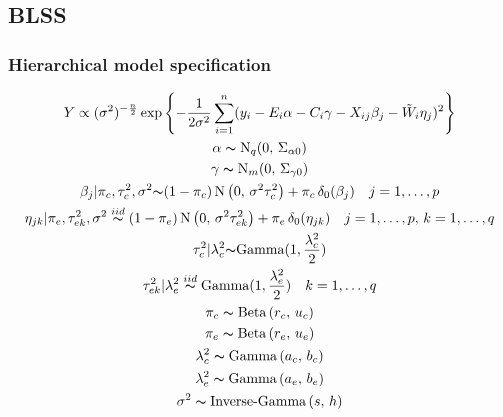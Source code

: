 \documentclass[12pt]{article}
\begin{document}
\subsection{BLSS}
\subsubsection{Hierarchical model specification}
\begin{gather*}
Y \propto (\sigma^{2})^{-\frac{n}{2}} \exp\left\{-\frac{1}{2\sigma^{2}} \sum_{i=1}^{n}(y_{i}- E_{i}\alpha - C_{i}\gamma - X_{ij}\beta_{j} - \tilde{W}_{i}\eta_{j})^{2} \right\} \\ 
\alpha \thicksim \text{N}_{q}(0, \, \Sigma_{\alpha0}) \\
\gamma \thicksim \text{N}_{m}(0, \, \Sigma_{\gamma0}) \\
\beta_{j}|\pi_{c}, \tau_{c}^{2}, \sigma^{2} {\thicksim} (1-\pi_{c})\, \text{N} \left(0,\, \sigma^{2} \tau_{c}^{2}\right) + \pi_c \,\delta_{0}(\beta_{j}) \quad j=1,\dots,p\\
\eta_{jk}|\pi_{e}, \tau_{ek}^{2}, \sigma^{2} \stackrel{iid}{\thicksim} (1-\pi_{e})\, \text{N} \left(0,\, \sigma^{2} \tau_{ek}^{2}\right) + \pi_e \,\delta_{0}(\eta_{jk}) \quad j=1,\dots,p,\, k=1,\dots,q \\
\tau_{c}^{2}|\lambda_{c}^{2}{\thicksim} \text{Gamma} (1, \frac{\lambda_{c}^{2}}{2})\\
\tau_{ek}^{2}|\lambda_{e}^{2}\stackrel{iid} {\thicksim} \text{Gamma} (1, \frac{\lambda_{e}^{2}}{2})\quad k=1,\dots,q\\
\pi_{c} \thicksim \text{Beta}\left(r_{c}, \, u_{c}\right) \\
\pi_{e} \thicksim \text{Beta}\left(r_{e}, \, u_{e}\right) \\
\lambda_{c}^2 \thicksim \text{Gamma}\left(a_{c}, \, b_{c}\right) \\
\lambda_{e}^2 \thicksim \text{Gamma}\left(a_{e}, \, b_{e}\right) \\
\sigma^{2} \thicksim \text{Inverse-Gamma}\left(s, \, h\right) 
\end{gather*}
\end{document}
